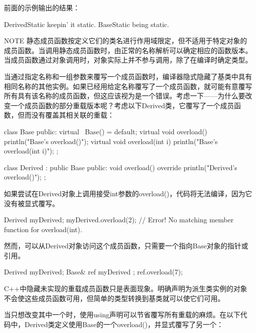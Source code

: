 前面的示例输出的结果：

\begin{shell}
DerivedStatic keepin' it static.
BaseStatic being static.
\end{shell}

\begin{myNotic}{NOTE}
静态成员函数按定义它们的类名进行作用域限定，但不适用于特定对象的成员函数。当调用静态成员函数时，由正常的名称解析可以确定相应的函数版本。当成员函数通过对象调用时，对象实际上并不参与调用，除了在编译时确定类型。
\end{myNotic}


当通过指定名称和一组参数来覆写一个成员函数时，编译器隐式隐藏了基类中具有相同名称的其他实例。如果已经用给定名称覆写了一个成员函数，就可能有意覆写所有具有该名称的成员函数，但这应该视为是一个错误。考虑一下——为什么要改变一个成员函数的部分重载版本呢？考虑以下Derived类，它覆写了一个成员函数，但而没有覆盖其相关联的重载：

\begin{cpp}
class Base
{
    public:
        virtual ~Base() = default;
        virtual void overload() { println("Base's overload()"); }
        virtual void overload(int i) { println("Base's overload(int i)"); }
};

class Derived : public Base
{
    public:
        void overload() override { println("Derived's overload()"); }
};
\end{cpp}

如果尝试在Derived对象上调用接受int参数的overload()，代码将无法编译，因为它没有被显式覆写。

\begin{cpp}
Derived myDerived;
myDerived.overload(2); // Error! No matching member function for overload(int).
\end{cpp}

然而，可以从Derived对象访问这个成员函数，只需要一个指向Base对象的指针或引用。

\begin{cpp}
Derived myDerived;
Base& ref { myDerived };
ref.overload(7);
\end{cpp}

C++中隐藏未实现的重载成员函数只是表面现象。明确声明为派生类实例的对象不会使这些成员函数可用，但简单的类型转换到基类就可以使它们可用。

当只想改变其中一个时，使用using声明可以节省覆写所有重载的麻烦。在以下代码中，Derived类定义使用Base的一个overload()，并显式覆写了另一个：

